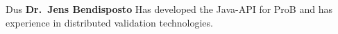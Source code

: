 \begin{sitedescription}{Dus}
\textbf{Dr.\ Jens Bendisposto}
Has developed the Java-API for ProB and has experience in distributed validation technologies.



\end{sitedescription}

